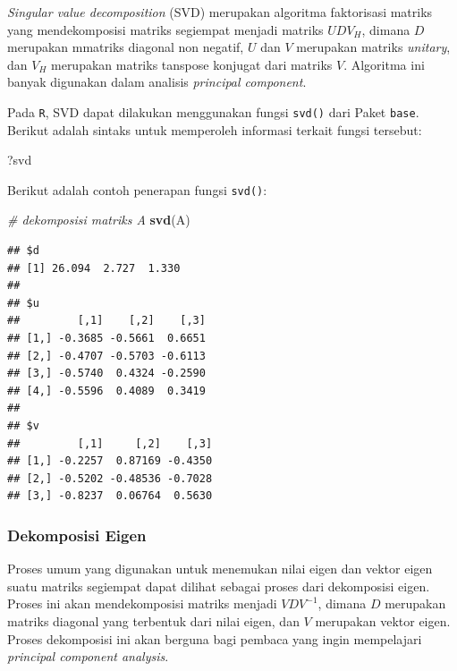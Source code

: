 \documentclass[]{book}
\newenvironment{Shaded}{\begin{snugshade}}{\end{snugshade}}
\newcommand{\CommentTok}[1]{\textcolor[rgb]{0.56,0.35,0.01}{\textit{#1}}}
\newcommand{\KeywordTok}[1]{\textcolor[rgb]{0.13,0.29,0.53}{\textbf{#1}}}
\newcommand{\NormalTok}[1]{#1}
\theoremstyle{definition}
\theoremstyle{definition}
\theoremstyle{definition}
\theoremstyle{remark}
\begin{document}
\emph{Singular value decomposition} (SVD) merupakan algoritma faktorisasi matriks yang mendekomposisi matriks segiempat menjadi matriks \(UDV_H\), dimana \(D\) merupakan mmatriks diagonal non negatif, \(U\) dan \(V\) merupakan matriks \emph{unitary}, dan \(V_H\) merupakan matriks tanspose konjugat dari matriks \(V\). Algoritma ini banyak digunakan dalam analisis \emph{principal component}.

Pada \texttt{R}, SVD dapat dilakukan menggunakan fungsi \texttt{svd()} dari Paket \texttt{base}. Berikut adalah sintaks untuk memperoleh informasi terkait fungsi tersebut:

\begin{Shaded}
\begin{Highlighting}[]
\NormalTok{?svd}
\end{Highlighting}
\end{Shaded}

Berikut adalah contoh penerapan fungsi \texttt{svd()}:

\begin{Shaded}
\begin{Highlighting}[]
\CommentTok{# dekomposisi matriks A}
\KeywordTok{svd}\NormalTok{(A)}
\end{Highlighting}
\end{Shaded}

\begin{verbatim}
## $d
## [1] 26.094  2.727  1.330
## 
## $u
##         [,1]    [,2]    [,3]
## [1,] -0.3685 -0.5661  0.6651
## [2,] -0.4707 -0.5703 -0.6113
## [3,] -0.5740  0.4324 -0.2590
## [4,] -0.5596  0.4089  0.3419
## 
## $v
##         [,1]     [,2]    [,3]
## [1,] -0.2257  0.87169 -0.4350
## [2,] -0.5202 -0.48536 -0.7028
## [3,] -0.8237  0.06764  0.5630
\end{verbatim}

\hypertarget{eigendecomp}{%
\subsubsection{Dekomposisi Eigen}\label{eigendecomp}}

Proses umum yang digunakan untuk menemukan nilai eigen dan vektor eigen suatu matriks segiempat dapat dilihat sebagai proses dari dekomposisi eigen. Proses ini akan mendekomposisi matriks menjadi \(VDV^{-1}\), dimana \(D\) merupakan matriks diagonal yang terbentuk dari nilai eigen, dan \(V\) merupakan vektor eigen. Proses dekomposisi ini akan berguna bagi pembaca yang ingin mempelajari \emph{principal component analysis}.
\end{document}
